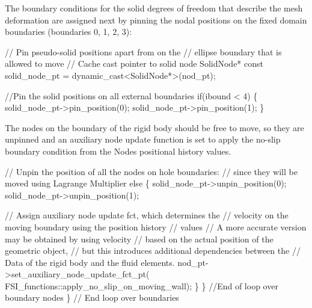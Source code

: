 The boundary conditions for the solid degrees of freedom that describe the mesh deformation are assigned next by pinning the nodal positions on the fixed domain boundaries (boundaries 0, 1, 2, 3)\+:


\begin{DoxyCodeInclude}
     
     \textcolor{comment}{// Pin pseudo-solid positions apart from on the }
     \textcolor{comment}{// ellipse boundary that is allowed to move}
     \textcolor{comment}{// Cache cast pointer to solid node}
     SolidNode* \textcolor{keyword}{const} solid\_node\_pt = \textcolor{keyword}{dynamic\_cast<}SolidNode*\textcolor{keyword}{>}(nod\_pt);
          
     \textcolor{comment}{//Pin the solid positions on all external boundaries}
     \textcolor{keywordflow}{if}(ibound < 4)
      \{
       solid\_node\_pt->pin\_position(0);
       solid\_node\_pt->pin\_position(1);
      \}

\end{DoxyCodeInclude}


The nodes on the boundary of the rigid body should be free to move, so they are unpinned and an auxiliary node update function is set to apply the no-\/slip boundary condition from the {\ttfamily Node\textquotesingle{}s} positional history values.


\begin{DoxyCodeInclude}
     \textcolor{comment}{// Unpin the position of all the nodes on hole boundaries:}
     \textcolor{comment}{// since they will be moved using Lagrange Multiplier}
     \textcolor{keywordflow}{else}
      \{
       solid\_node\_pt->unpin\_position(0);
       solid\_node\_pt->unpin\_position(1);
       
       \textcolor{comment}{// Assign auxiliary node update fct, which determines the}
       \textcolor{comment}{// velocity on the moving boundary using the position history}
       \textcolor{comment}{// values}
       \textcolor{comment}{// A more accurate version may be obtained by using velocity}
       \textcolor{comment}{// based on the actual position of the geometric object,}
       \textcolor{comment}{// but this introduces additional dependencies between the}
       \textcolor{comment}{// Data of the rigid body and the fluid elements.}
       nod\_pt->set\_auxiliary\_node\_update\_fct\_pt(
        FSI\_functions::apply\_no\_slip\_on\_moving\_wall); 
      \}
    \} \textcolor{comment}{//End of loop over boundary nodes}
  \} \textcolor{comment}{// End loop over boundaries}

\end{DoxyCodeInclude}


